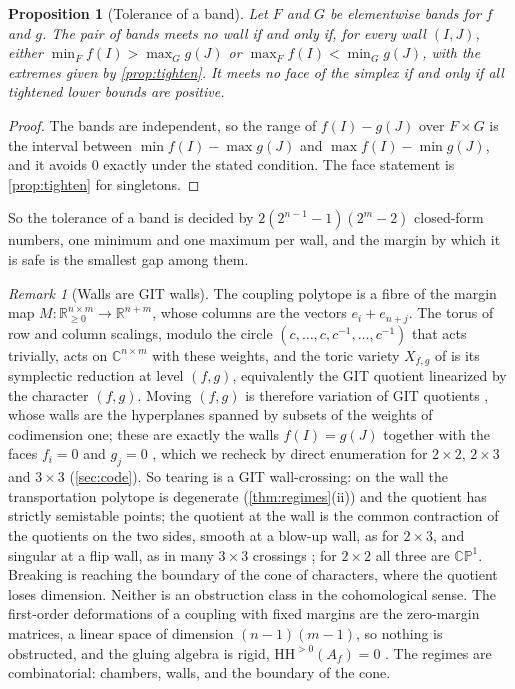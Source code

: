 \documentclass[11pt]{article}
\newtheorem{proposition}[theorem]{Proposition}
\theoremstyle{definition}
\theoremstyle{remark}
\newtheorem{remark}[theorem]{Remark}
\newcommand{\R}{\mathbb{R}}
\begin{document}
\begin{proposition}[Tolerance of a band]\label{prop:bandsafe}
Let $F$ and $G$ be elementwise bands for $f$ and $g$. The pair of bands meets no wall if and only if, for every wall $(I,J)$,
either $\min_Ff(I)>\max_Gg(J)$ or $\max_Ff(I)<\min_Gg(J)$, with the extremes given by \cref{prop:tighten}. It meets no face of
the simplex if and only if all tightened lower bounds are positive.
\end{proposition}
\begin{proof}
The bands are independent, so the range of $f(I)-g(J)$ over $F\times G$ is the interval between $\min f(I)-\max g(J)$ and
$\max f(I)-\min g(J)$, and it avoids $0$ exactly under the stated condition. The face statement is \cref{prop:tighten} for
singletons.
\end{proof}

So the tolerance of a band is decided by $2(2^{n-1}-1)(2^m-2)$ closed-form numbers, one minimum and one maximum per wall,
and the margin by which it is safe is the smallest gap among them.

\begin{remark}[Walls are GIT walls]\label{rem:git}
The coupling polytope is a fibre of the margin map $M:\R^{n\times m}_{\ge0}\to\R^{n+m}$, whose columns are the vectors
$e_i+e_{n+j}$. The torus of row and column scalings, modulo the circle $(c,\dots,c,c^{-1},\dots,c^{-1})$ that acts trivially, acts on
$\mathbb{C}^{n\times m}$ with these weights, and the toric variety $X_{f,g}$ of \cite[Thm.~6.4]{Conditionals} is its symplectic
reduction at level $(f,g)$, equivalently the GIT quotient linearized by the character $(f,g)$. Moving $(f,g)$ is therefore
variation of GIT quotients \cite{Thaddeus1996,DolgachevHu1998}, whose walls are the hyperplanes spanned by subsets of the weights
of codimension one; these are exactly the walls $f(I)=g(J)$ together with the faces $f_i=0$ and $g_j=0$ \cite[Prop.~10.5]{Conditionals},
which we recheck by direct enumeration for $2\times2$, $2\times3$ and $3\times3$ (\cref{sec:code}). So tearing is a GIT wall-crossing: on the wall the transportation polytope is degenerate (\cref{thm:regimes}(ii)) and the
quotient has strictly semistable points; the quotient at the wall is the common contraction of the quotients on the two sides, smooth at a
blow-up wall, as for $2\times3$, and singular at a flip wall, as in many $3\times3$ crossings \cite[\S10.2]{Conditionals}; for $2\times2$ all three
are $\mathbb{CP}^1$. Breaking is reaching the boundary of the cone of
characters, where the quotient loses dimension. Neither is an obstruction class in the cohomological sense. The first-order
deformations of a coupling with fixed margins are the zero-margin matrices, a linear space of dimension $(n-1)(m-1)$, so nothing is
obstructed, and the gluing algebra is rigid, $\mathrm{HH}^{>0}(A_f)=0$ \cite{Algebras}. The regimes are combinatorial: chambers,
walls, and the boundary of the cone.
\end{remark}
\end{document}
